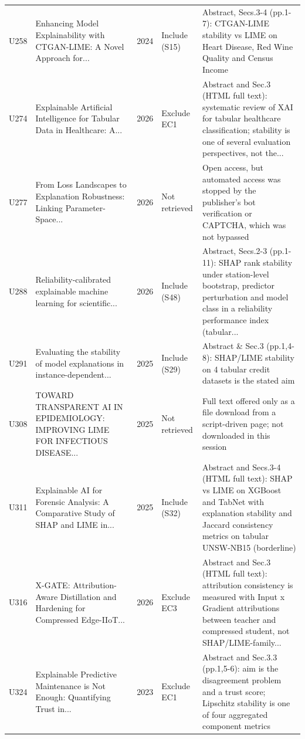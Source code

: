 \begin{longtable}{@{}P{1.0cm}P{6.3cm}P{0.7cm}P{1.6cm}P{6.1cm}@{}}
U258 & Enhancing Model Explainability with CTGAN-LIME: A Novel Approach for... & 2024 & Include (S15) & Abstract, Secs.3-4 (pp.1-7): CTGAN-LIME stability vs LIME on Heart Disease, Red Wine Quality and Census Income \\
U274 & Explainable Artificial Intelligence for Tabular Data in Healthcare: A... & 2026 & Exclude EC1 & Abstract and Sec.3 (HTML full text): systematic review of XAI for tabular healthcare classification; stability is one of several evaluation perspectives, not the... \\
U277 & From Loss Landscapes to Explanation Robustness: Linking Parameter-Space... & 2026 & Not retrieved & Open access, but automated access was stopped by the publisher's bot verification or CAPTCHA, which was not bypassed \\
U288 & Reliability-calibrated explainable machine learning for scientific... & 2026 & Include (S48) & Abstract, Secs.2-3 (pp.1-11): SHAP rank stability under station-level bootstrap, predictor perturbation and model class in a reliability performance index (tabular... \\
U291 & Evaluating the stability of model explanations in instance-dependent... & 2025 & Include (S29) & Abstract \& Sec.3 (pp.1,4-8): SHAP/\allowbreak{}LIME stability on 4 tabular credit datasets is the stated aim \\
U308 & TOWARD TRANSPARENT AI IN EPIDEMIOLOGY: IMPROVING LIME FOR INFECTIOUS DISEASE... & 2025 & Not retrieved & Full text offered only as a file download from a script-driven page; not downloaded in this session \\
U311 & Explainable AI for Forensic Analysis: A Comparative Study of SHAP and LIME in... & 2025 & Include (S32) & Abstract and Secs.3-4 (HTML full text): SHAP vs LIME on XGBoost and TabNet with explanation stability and Jaccard consistency metrics on tabular UNSW-NB15 (borderline) \\
U316 & X-GATE: Attribution-Aware Distillation and Hardening for Compressed Edge-IIoT... & 2026 & Exclude EC3 & Abstract and Sec.3 (HTML full text): attribution consistency is measured with Input x Gradient attributions between teacher and compressed student, not SHAP/\allowbreak{}LIME-family... \\
U324 & Explainable Predictive Maintenance is Not Enough: Quantifying Trust in... & 2023 & Exclude EC1 & Abstract and Sec.3.3 (pp.1,5-6): aim is the disagreement problem and a trust score; Lipschitz stability is one of four aggregated component metrics \\

\end{longtable}
